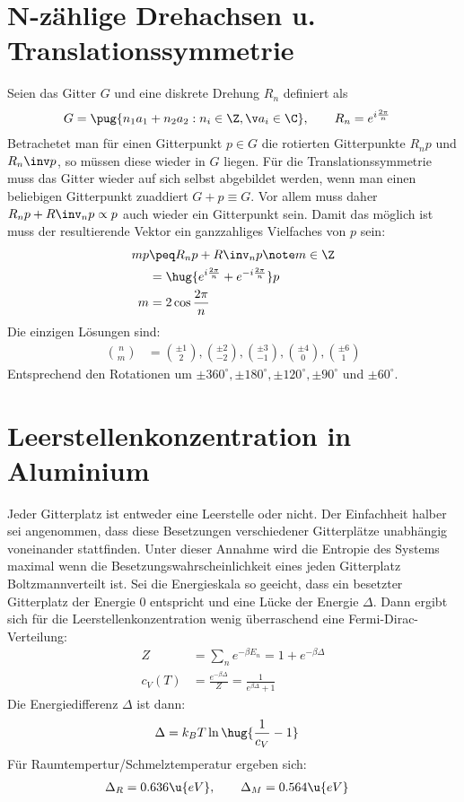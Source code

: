 \documentclass[exa]{exercise_5.0}
\begin{document}
\section{N-zählige Drehachsen u. Translationssymmetrie}
Seien das Gitter $G$ und eine diskrete Drehung $R_n$ definiert als
\begin{align*}
    G &= \pug{n_1  a_1 + n_2  a_2: n_i\in\Z, \v a_i\in \C},\qquad R_n= e^{i\frac{2\pi}{n}}
\end{align*}
Betrachetet man für einen Gitterpunkt $p\in G$ die rotierten Gitterpunkte $R_n p$ und $R_n\inv p$, so müssen diese wieder in $G$ liegen. Für die Translationssymmetrie muss das Gitter wieder auf sich selbst abgebildet werden, wenn man einen beliebigen Gitterpunkt zuaddiert $G+p \equiv G$. Vor allem muss daher $R_n p + R\inv _n p\propto p$ auch wieder ein Gitterpunkt sein. Damit das möglich ist muss der resultierende Vektor ein ganzzahliges Vielfaches von $p$ sein: 
\begin{align*}
    m p &\peq R_n p + R\inv _n p\note m\in\Z\\
    &= \hug{e^{i\frac{2\pi}{n}} + e^{-i\frac{2\pi}{n}}}p\\
    m &= 2\cos\frac{2\pi}{n}
\end{align*}
Die einzigen Lösungen sind:
\begin{align*}
    \binom nm &= \binom{\pm 1}{2},\binom{\pm2}{-2},\binom{\pm 3}{-1},\binom{\pm4}{0}, \binom{\pm6}{1}
\end{align*}
Entsprechend den Rotationen um $\pm360^\circ, \pm180^\circ, \pm120^\circ,\pm90^\circ$ und $\pm60^\circ$.

\section{Leerstellenkonzentration in Aluminium}
Jeder Gitterplatz ist entweder eine Leerstelle oder nicht. Der Einfachheit halber sei angenommen, dass diese Besetzungen verschiedener Gitterplätze unabhängig voneinander stattfinden. Unter dieser Annahme wird die Entropie des Systems maximal wenn die Besetzungswahrscheinlichkeit eines jeden Gitterplatz Boltzmannverteilt ist. Sei die Energieskala so geeicht, dass ein besetzter Gitterplatz der Energie $0$ entspricht und eine Lücke der Energie $\Delta$. Dann ergibt sich für die Leerstellenkonzentration wenig überraschend eine Fermi-Dirac-Verteilung:
\begin{align*}
    Z &= \sum_n e^{-\beta E_n} = 1 + e^{-\beta \Delta}\\ 
    c_V(T) &= \frac{e^{-\beta\Delta }}{Z} = \frac1{e^{\beta \Delta} + 1}
\end{align*}
Die Energiedifferenz $\Delta$ ist dann:
\begin{align*}
    \Delta&= k_B T \ln\hug{\frac1{c_V}-1}
\end{align*}
Für Raumtempertur/Schmelztemperatur ergeben sich:
\begin{align*}
    \Delta_R &= 0.636\u{eV}, \qquad \Delta_M = 0.564 \u{eV}
\end{align*}
\end{document}
